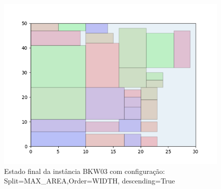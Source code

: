 \begin{figure}[H]
    \centering
    \caption[]{Estado final da instância BKW03 com configuração: Split=MAX_AREA,Order=WIDTH, descending=True}
    \label{fig:bkw03-max_area-width-true}
    \includegraphics[scale=0.5]{output/figures/bkw/bkw03/max_area/width/true/00}
\end{figure}